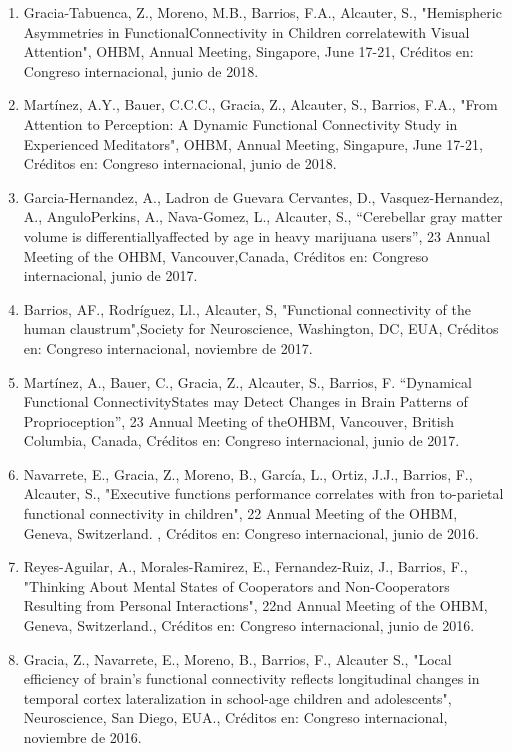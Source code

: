 \documentclass[12pt]{article}
\begin{document}
\begin{enumerate}
\item Gracia-Tabuenca, Z., Moreno, M.B., Barrios, F.A., Alcauter, S., "Hemispheric Asymmetries in FunctionalConnectivity in Children 
correlatewith Visual Attention", OHBM, Annual Meeting, Singapore, June 17-21, Créditos en: Congreso internacional, junio de 2018.

\item Martínez, A.Y., Bauer, C.C.C., Gracia, Z., Alcauter, S., Barrios, F.A., "From Attention to Perception: A Dynamic Functional 
Connectivity Study in Experienced Meditators", OHBM, Annual Meeting, Singapure, June 17-21, Créditos en: Congreso internacional, junio 
de 2018.

\item Garcia-Hernandez, A., Ladron de Guevara Cervantes, D., Vasquez-Hernandez, A., AnguloPerkins, A., Nava-Gomez, L., Alcauter, S., 
“Cerebellar gray matter volume is differentiallyaffected by age in heavy marijuana users”, 23 Annual Meeting of the OHBM, 
Vancouver,Canada, Créditos en: Congreso internacional, junio de 2017.

\item Barrios, AF., Rodríguez, Ll., Alcauter, S, "Functional connectivity of the human claustrum",Society for Neuroscience, Washington, 
DC, EUA, Créditos en: Congreso internacional, noviembre de 2017.

\item Martínez, A., Bauer, C., Gracia, Z., Alcauter, S., Barrios, F. “Dynamical Functional ConnectivityStates may Detect Changes in 
Brain 
Patterns of Proprioception”, 23 Annual Meeting of theOHBM, Vancouver, British Columbia, Canada, Créditos en: Congreso internacional, 
junio de 2017.

\item Navarrete, E., Gracia, Z., Moreno, B., García, L., Ortiz, J.J., Barrios, F., Alcauter, S., "Executive functions performance 
correlates with fron to-parietal functional connectivity in children", 22 Annual Meeting of the OHBM, Geneva, Switzerland. , Créditos 
en: Congreso internacional, junio de 2016.

\item Reyes-Aguilar, A., Morales-Ramirez, E., Fernandez-Ruiz, J., Barrios, F., "Thinking About Mental States of Cooperators and 
Non-Cooperators Resulting from Personal Interactions", 22nd Annual Meeting of the OHBM, Geneva, Switzerland., Créditos en: Congreso 
internacional, junio de 2016.

\item Gracia, Z., Navarrete, E., Moreno, B., Barrios, F., Alcauter S., "Local efficiency of brain's functional connectivity reflects 
longitudinal changes in temporal cortex lateralization in school-age children and adolescents", Neuroscience, San Diego, EUA., Créditos 
en: Congreso internacional, noviembre de 2016.


\end{enumerate}
\end{document}
